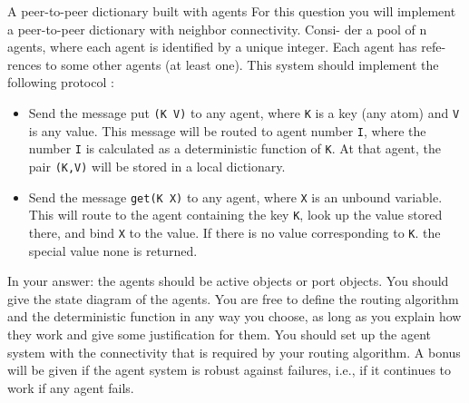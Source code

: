 \begin{Q2}{A peer-to-peer dictionary built with agents}
  For this question you will implement a peer-to-peer dictionary with neighbor connectivity. Consi-
  der a pool of n agents, where each agent is identified by a unique integer. Each agent has refe-
  rences to some other agents (at least one). This system should implement the following protocol :
  \begin{itemize}
    \item Send the message put \lstinline|(K V)| to any agent, where \lstinline|K| is a key (any atom) and \lstinline|V| is any value.
      This message will be routed to agent number \lstinline|I|, where the number \lstinline|I| is calculated as a
      deterministic function of \lstinline|K|. At that agent, the pair \lstinline|(K,V)| will be stored in a local dictionary.
    \item Send the message \lstinline|get(K X)| to any agent, where \lstinline|X| is an unbound variable. This will route
      to the agent containing the key \lstinline|K|, look up the value stored there, and bind \lstinline|X| to the value.
      If there is no value corresponding to \lstinline|K|. the special value none is returned.
  \end{itemize}
  In your answer: the agents should be active objects or port objects. You should give the state
  diagram of the agents. You are free to define the routing algorithm and the deterministic function
  in any way you choose, as long as you explain how they work and give some justification for
  them. You should set up the agent system with the connectivity that is required by your routing
  algorithm. A bonus will be given if the agent system is robust against failures, i.e., if it continues
  to work if any agent fails.
\end{Q2}


